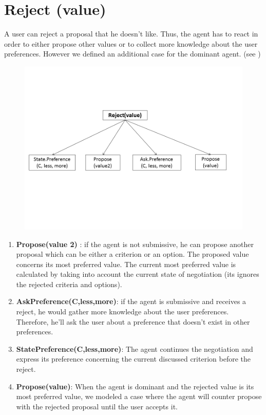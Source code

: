 \documentclass{llncs}
\begin{document}
\section{Reject (value)}
\par A user can reject a proposal that he doesn't like. Thus, the agent has to react in order to either propose other values or to collect more knowledge about the user preferences. However we defined an additional case for the dominant agent. (see )
\begin{figure}
	\centerline{\includegraphics[width=5in]{utterances/Diapositive4.PNG}}
	\vskip 8pt
\end{figure}
\begin{enumerate}
	 
	\item \textbf{Propose(value 2)} : if the agent is not submissive, he can propose another proposal which can be either a criterion or an option. The proposed value concerns its most preferred value. The current most preferred value is calculated by taking into account the current state of negotiation (its ignores the rejected criteria and options).
	\item \textbf{AskPreference(C,less,more)}: if the agent is submissive and receives a reject, he would gather more knowledge about the user preferences. Therefore, he'll ask the user about a preference that doesn't exist in other preferences. 
	
	
	\item \textbf{StatePreference(C,less,more)}: The agent continues the negotiation and express its preference concerning the current discussed criterion before the reject.
	
	\item \textbf{Propose(value)}: When the agent is dominant and the rejected value is its most preferred value, we modeled a case where the agent will counter propose with the rejected proposal until the user accepts it. 
			 
\end{enumerate}	
\end{document}

